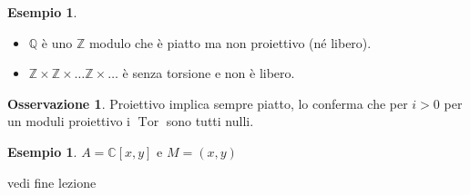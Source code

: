\documentclass[a4paper,11pt,oneside]{book}
\newcommand{\Z}{\mathbb{Z}}
\DeclareMathOperator{\Tor}{Tor}
\theoremstyle{definition}
\newtheorem{esem}[section]{Esempio}
\newtheorem{oss}[section]{Osservazione}
\begin{document}
  \begin{esem}\*
   \begin{itemize}
    \item $\mathbb Q$ è uno $\Z$ modulo che è piatto ma non proiettivo (né libero).
    \item $\Z\times \Z\times\dots \Z\times \dots$ è senza torsione e non è libero.
   \end{itemize}
  \end{esem}
  \begin{oss}
   Proiettivo implica sempre piatto, lo conferma che per $i>0$ per un moduli proiettivo i $\Tor$ sono tutti nulli.
  \end{oss}
  
  \begin{esem}
   $A=\mathbb C[x,y]$ e $M=(x,y)$ 
  \end{esem}

  {\sc vedi fine lezione}
\end{document}
